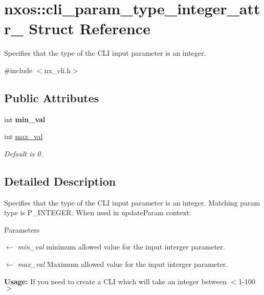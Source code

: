 \hypertarget{structnxos_1_1cli__param__type__integer__attr__}{
\section{nxos::cli\_\-param\_\-type\_\-integer\_\-attr\_\- Struct Reference}
\label{structnxos_1_1cli__param__type__integer__attr__}
}


Specifies that the type of the CLI input parameter is an integer.  


{\ttfamily \#include $<$nx\_\-cli.h$>$}\subsection*{Public Attributes}
\begin{DoxyCompactItemize}
\item 
\hypertarget{structnxos_1_1cli__param__type__integer__attr___af6129171a34b028c5faeb503e8a1985b}{
int {\bfseries min\_\-val}}
\label{structnxos_1_1cli__param__type__integer__attr___af6129171a34b028c5faeb503e8a1985b}

\item 
\hypertarget{structnxos_1_1cli__param__type__integer__attr___a87f179239023d52fa94192e0816a03ff}{
int \hyperlink{structnxos_1_1cli__param__type__integer__attr___a87f179239023d52fa94192e0816a03ff}{max\_\-val}}
\label{structnxos_1_1cli__param__type__integer__attr___a87f179239023d52fa94192e0816a03ff}

\begin{DoxyCompactList}\small\item\em Default is 0. \item\end{DoxyCompactList}\end{DoxyCompactItemize}


\subsection{Detailed Description}
Specifies that the type of the CLI input parameter is an integer. Matching param type is P\_\-INTEGER. When used in updateParam context: 
\begin{DoxyParams}{Parameters}
\item[\mbox{$\leftarrow$} {\em min\_\-val}]minimum allowed value for the input interger parameter. \item[\mbox{$\leftarrow$} {\em max\_\-val}]Maximum allowed value for the input interger parameter.\end{DoxyParams}
{\bfseries  Usage: } If you need to create a CLI which will take an integer between $<$1-\/100$>$ \par


